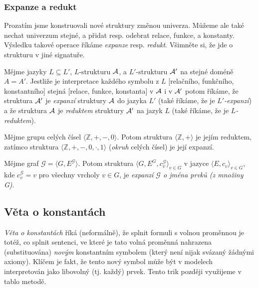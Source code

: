 \subsubsection{Expanze a redukt}

Prozatím jsme konstruovali nové struktury změnou univerza. Můžeme ale také nechat univerzum stejné, a přidat resp. odebrat relace, funkce, a konstanty. Výsledku takové operace říkáme \emph{expanze} resp. \emph{redukt}. Všimněte si, že jde o strukturu v jiné signatuře.

\begin{definition}
    Mějme jazyky $L\subseteq L'$, $L$-strukturu $\mathcal{A}$, a $L'$-strukturu $\mathcal{A}'$ na stejné doméně $A=A'$. Jestliže je interpretace každého symbolu z $L$ [relačního, funkčního, konstantního] stejná [relace, funkce, konstanta] v $\mathcal{A}$ i v $\mathcal{A}'$ potom říkáme, že struktura $\mathcal{A}'$ je \emph{expanzí} struktury $\mathcal{A}$ do jazyka $L'$ (také říkáme, že je \emph{$L'$-expanzí}) a že struktura $\mathcal{A}$ je \emph{reduktem} struktury $\mathcal{A}'$ na jazyk $L$ (také říkáme, že je \emph{$L$-reduktem}).    
\end{definition}

\begin{example}
    Mějme grupu celých čísel $\langle\mathbb Z,+,-,0\rangle$. Potom struktura $\langle \mathbb Z,+\rangle$ je jejím reduktem, zatímco struktura $\langle\mathbb Z,+,-,0,\cdot,1\rangle$ (\emph{okruh} celých čísel) je její expanzí.
\end{example}

\begin{example}
    Mějme graf $\mathcal G=\langle G, E^\mathcal G\rangle$. Potom struktura $\langle G, E^G,c_v^\mathcal G\rangle_{v\in G}$ v jazyce $\langle E,c_v\rangle_{v\in G}$, kde $c_v^\mathcal G=v$ pro všechny vrcholy $v\in G$, je \emph{expanzí $\mathcal G$ o jména prvků (z množiny G)}.
\end{example}


\subsection{Věta o konstantách}

\emph{Věta o konstantách} říká (neformálně), že splnit formuli s volnou proměnnou je totéž, co splnit sentenci, ve které je tato volná proměnná nahrazena (substituována) \emph{novým} konstantním symbolem (který není nijak svázaný žádnými axiomy). Klíčem je fakt, že tento nový symbol může být v modelech interpretován jako libovolný (tj. každý) prvek. Tento trik později využijeme v tablo metodě.

